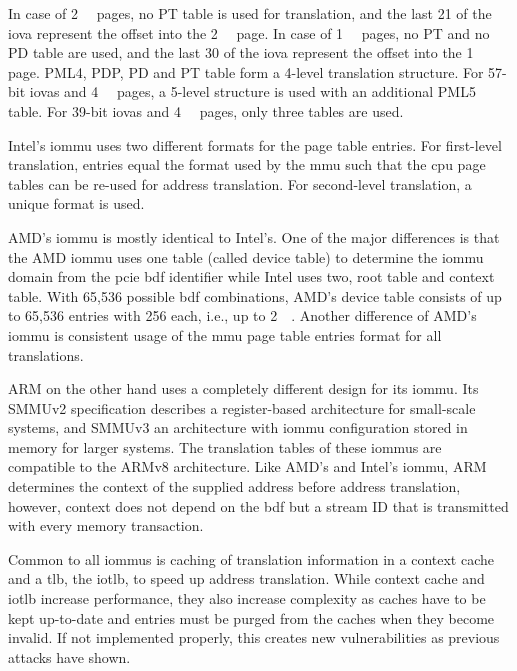 In case of \SI{2}{\mebi\byte} pages, no PT table is used for translation, and
the last \SI{21}{\bit} of the \ac{iova} represent the offset into the
\SI{2}{\mebi\byte} page. In case of \SI{1}{\gibi\byte} pages, no PT and no PD
table are used, and the last \SI{30}{\bit} of the \ac{iova} represent the offset
into the \SI{1}{\gibi\byte} page. PML4, PDP, PD and PT table form a 4-level
translation structure. For 57-bit \acp{iova} and \SI{4}{\kibi\byte} pages, a
5-level structure is used with an additional PML5 table. For 39-bit \acp{iova}
and \SI{4}{\kibi\byte} pages, only three tables are used.

Intel's \ac{iommu} uses two different formats for the page table entries. For
first-level translation, entries equal the format used by the \ac{mmu} such that
the \ac{cpu} page tables can be re-used for address translation. For
second-level translation, a unique format is used.

AMD's \ac{iommu} is mostly identical to Intel's. One of the major differences is
that the AMD \ac{iommu} uses one table (called device table) to determine the
\ac{iommu} domain from the \ac{pcie} \ac{bdf} identifier while Intel uses two,
root table and context table. With 65,536 possible \ac{bdf} combinations, AMD's
device table consists of up to 65,536 entries with \SI{256}{\bit} each, i.e., up
to \SI{2}{\mebi\byte}. Another difference of AMD's \ac{iommu} is consistent
usage of the \ac{mmu} page table entries format for all translations.

ARM on the other hand uses a completely different design for its \ac{iommu}. Its
SMMUv2 specification describes a register-based architecture for small-scale
systems, and SMMUv3 an architecture with \ac{iommu} configuration stored in
memory for larger systems. The translation tables of these \acp{iommu} are
compatible to the ARMv8 architecture. Like AMD's and Intel's \ac{iommu}, ARM
determines the context of the supplied address before address translation,
however, context does not depend on the \ac{bdf} but a stream ID that is
transmitted with every memory transaction.

Common to all \acp{iommu} is caching of translation information in a context
cache and a \ac{tlb}, the \ac{iotlb}, to speed up address translation. While
context cache and \ac{iotlb} increase performance, they also increase complexity
as caches have to be kept up-to-date and entries must be purged from the caches
when they become invalid. If not implemented properly, this creates new
vulnerabilities as previous attacks have shown.


